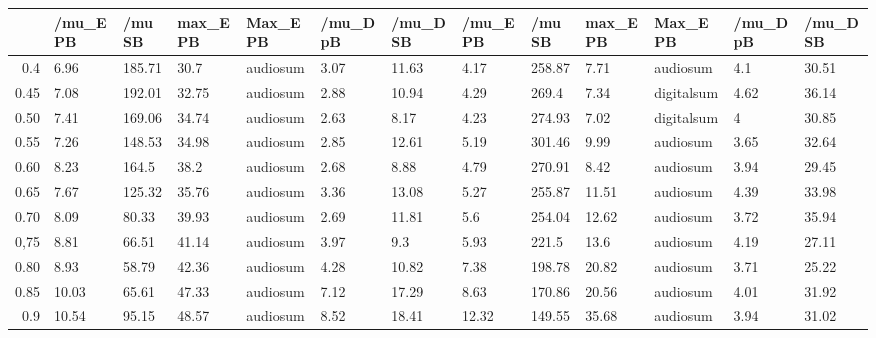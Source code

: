 \begin{table}[ht]
\centering
\begin{tabular}{rllllllllllll}
  \hline
 & /mu\_E PB & /mu SB & max\_E PB & Max\_E PB & /mu\_D pB & /mu\_D SB & /mu\_E PB & /mu SB & max\_E PB & Max\_E PB & /mu\_D pB & /mu\_D SB \\ 
  \hline
0.4 & 6.96 & 185.71 & 30.7 & audiosum & 3.07 & 11.63 & 4.17 & 258.87 & 7.71 & audiosum & 4.1 & 30.51 \\ 
  0.45 & 7.08 & 192.01 & 32.75 & audiosum & 2.88 & 10.94 & 4.29 & 269.4 & 7.34 & digitalsum & 4.62 & 36.14 \\ 
  0.50 & 7.41 & 169.06 & 34.74 & audiosum & 2.63 & 8.17 & 4.23 & 274.93 & 7.02 & digitalsum & 4 & 30.85 \\ 
  0.55 & 7.26 & 148.53 & 34.98 & audiosum & 2.85 & 12.61 & 5.19 & 301.46 & 9.99 & audiosum & 3.65 & 32.64 \\ 
  0.60 & 8.23 & 164.5 & 38.2 & audiosum & 2.68 & 8.88 & 4.79 & 270.91 & 8.42 & audiosum & 3.94 & 29.45 \\ 
  0.65 & 7.67 & 125.32 & 35.76 & audiosum & 3.36 & 13.08 & 5.27 & 255.87 & 11.51 & audiosum & 4.39 & 33.98 \\ 
  0.70 & 8.09 & 80.33 & 39.93 & audiosum & 2.69 & 11.81 & 5.6 & 254.04 & 12.62 & audiosum & 3.72 & 35.94 \\ 
  0,75 & 8.81 & 66.51 & 41.14 & audiosum & 3.97 & 9.3 & 5.93 & 221.5 & 13.6 & audiosum & 4.19 & 27.11 \\ 
  0.80 & 8.93 & 58.79 & 42.36 & audiosum & 4.28 & 10.82 & 7.38 & 198.78 & 20.82 & audiosum & 3.71 & 25.22 \\ 
  0.85 & 10.03 & 65.61 & 47.33 & audiosum & 7.12 & 17.29 & 8.63 & 170.86 & 20.56 & audiosum & 4.01 & 31.92 \\ 
  0.9 & 10.54 & 95.15 & 48.57 & audiosum & 8.52 & 18.41 & 12.32 & 149.55 & 35.68 & audiosum & 3.94 & 31.02 \\ 
   \hline
\end{tabular}
\end{table}
